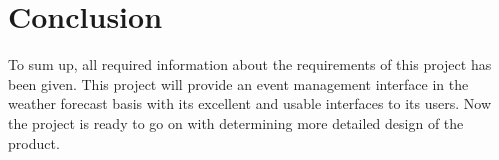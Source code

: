 \newpage
\section{Conclusion} 
\quad To sum up, all required information about the requirements of this project has been given. This project will provide an event management interface in the weather forecast basis with its excellent and usable interfaces to its users. Now the project is ready to go on with determining more detailed design of the product. 
